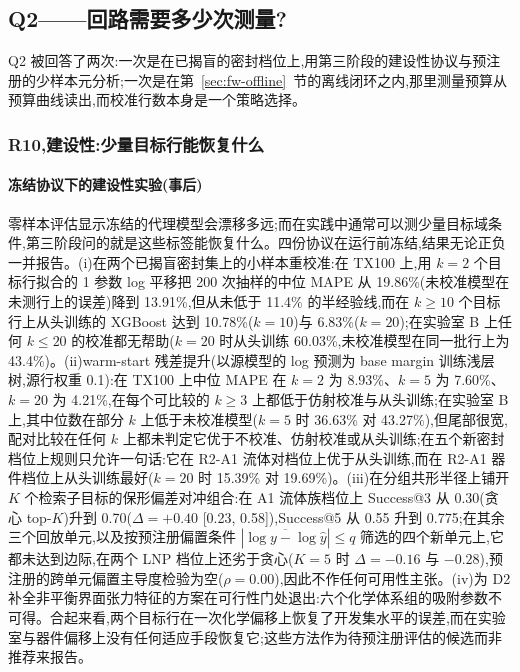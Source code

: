 \documentclass[11pt,a4paper]{ctexart}
\newcommand{\tox}{TX100}
\begin{document}
\subsection{Q2——回路需要多少次测量?}
\label{sec:q2}
Q2 被回答了两次:一次是在已揭盲的密封档位上,用第三阶段的建设性协议与预注册的少样本元分析;一次是在第~\ref{sec:fw-offline}~节的离线闭环之内,那里测量预算从预算曲线读出,而校准行数本身是一个策略选择。

\subsubsection{R10,建设性:少量目标行能恢复什么}
\label{sec:r10constructive}
\paragraph{冻结协议下的建设性实验(事后)} 零样本评估显示冻结的代理模型会漂移多远;而在实践中通常可以测少量目标域条件,第三阶段问的就是这些标签能恢复什么。四份协议在运行前冻结,结果无论正负一并报告。(i)在两个已揭盲密封集上的小样本重校准:在 \tox{} 上,用 $k=2$ 个目标行拟合的 1 参数 log 平移把 200 次抽样的中位 MAPE 从 19.86\%(未校准模型在未测行上的误差)降到 13.91\%,但从未低于 11.4\% 的半经验线,而在 $k\ge 10$ 个目标行上从头训练的 XGBoost 达到 10.78\%($k=10$)与 6.83\%($k=20$);在实验室 B 上任何 $k\le 20$ 的校准都无帮助($k=20$ 时从头训练 60.03\%,未校准模型在同一批行上为 43.4\%)。(ii)warm-start 残差提升(以源模型的 log 预测为 base margin 训练浅层树,源行权重 0.1):在 \tox{} 上中位 MAPE 在 $k=2$ 为 8.93\%、$k=5$ 为 7.60\%、$k=20$ 为 4.21\%,在每个可比较的 $k\ge 3$ 上都低于仿射校准与从头训练;在实验室 B 上,其中位数在部分 $k$ 上低于未校准模型($k=5$ 时 36.63\% 对 43.27\%),但尾部很宽,配对比较在任何 $k$ 上都未判定它优于不校准、仿射校准或从头训练;在五个新密封档位上规则只允许一句话:它在 R2-A1 流体对档位上优于从头训练,而在 R2-A1 器件档位上从头训练最好($k=20$ 时 15.39\% 对 19.69\%)。(iii)在分组共形半径上铺开 $K$ 个检索子目标的保形偏差对冲组合:在 A1 流体族档位上 Success@3 从 0.30(贪心 top-$K$)升到 0.70($\Delta=+0.40$ [0.23, 0.58]),Success@5 从 0.55 升到 0.775;在其余三个回放单元,以及按预注册偏置条件 $|\overline{\log y-\log\hat y}|\le q$ 筛选的四个新单元上,它都未达到边际,在两个 LNP 档位上还劣于贪心($K=5$ 时 $\Delta=-0.16$ 与 $-0.28$),预注册的跨单元偏置主导度检验为空($\rho=0.00$),因此不作任何可用性主张。(iv)为 D2 补全非平衡界面张力特征的方案在可行性门处退出:六个化学体系组的吸附参数不可得。合起来看,两个目标行在一次化学偏移上恢复了开发集水平的误差,而在实验室与器件偏移上没有任何适应手段恢复它;这些方法作为待预注册评估的候选而非推荐来报告。
\end{document}
